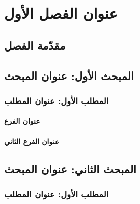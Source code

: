 
\chapter{عنوان الفصل الأول}
\section*{مقدّمة الفصل}


\section{المبحث الأول: عنوان المبحث}
\subsection{المطلب الأول: عنوان المطلب}
\subsubsection{عنوان الفرع}


\subsubsection{عنوان الفرع الثاني}


\section{المبحث الثاني: عنوان المبحث}
\subsection{المطلب الأول: عنوان المطلب}

